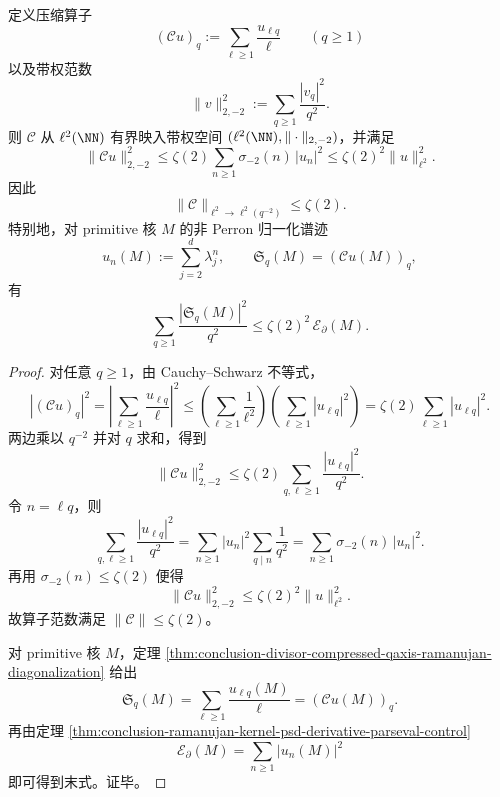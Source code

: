 \begin{theorem}\label{thm:conclusion-divisor-compressed-qaxis-hilbert-boundedness}
定义压缩算子
\[
(\mathcal C u)_q:=\sum_{\ell\ge 1}\frac{u_{\ell q}}{\ell}\qquad (q\ge 1)
\]
以及带权范数
\[
\|v\|_{2,-2}^2:=\sum_{q\ge 1}\frac{|v_q|^2}{q^2}.
\]
则 \(\mathcal C\) 从 \(\ell^2(\NN)\) 有界映入带权空间 \((\ell^2(\NN),\|\cdot\|_{2,-2})\)，并满足
\[
\|\mathcal C u\|_{2,-2}^2
\le
\zeta(2)\sum_{n\ge 1}\sigma_{-2}(n)\,|u_n|^2
\le
\zeta(2)^2\|u\|_{\ell^2}^2.
\]
因此
\[
\|\mathcal C\|_{\ell^2\to \ell^2(q^{-2})}\le \zeta(2).
\]
特别地，对 primitive 核 \(M\) 的非 Perron 归一化谱迹
\[
u_n(M):=\sum_{j=2}^d\lambda_j^n,
\qquad
\mathfrak S_q(M)=(\mathcal C u(M))_q,
\]
有
\[
\sum_{q\ge 1}\frac{|\mathfrak S_q(M)|^2}{q^2}
\le
\zeta(2)^2\,\mathcal E_{\partial}(M).
\]
\end{theorem}
\begin{proof}
对任意 \(q\ge 1\)，由 Cauchy--Schwarz 不等式，
\[
|(\mathcal C u)_q|^2
=
\left|\sum_{\ell\ge 1}\frac{u_{\ell q}}{\ell}\right|^2
\le
\left(\sum_{\ell\ge 1}\frac1{\ell^2}\right)
\left(\sum_{\ell\ge 1}|u_{\ell q}|^2\right)
=
\zeta(2)\sum_{\ell\ge 1}|u_{\ell q}|^2.
\]
两边乘以 \(q^{-2}\) 并对 \(q\) 求和，得到
\[
\|\mathcal C u\|_{2,-2}^2
\le
\zeta(2)\sum_{q,\ell\ge 1}\frac{|u_{\ell q}|^2}{q^2}.
\]
令 \(n=\ell q\)，则
\[
\sum_{q,\ell\ge 1}\frac{|u_{\ell q}|^2}{q^2}
=
\sum_{n\ge 1}|u_n|^2\sum_{q\mid n}\frac1{q^2}
=
\sum_{n\ge 1}\sigma_{-2}(n)\,|u_n|^2.
\]
再用 \(\sigma_{-2}(n)\le \zeta(2)\) 便得
\[
\|\mathcal C u\|_{2,-2}^2
\le
\zeta(2)^2\|u\|_{\ell^2}^2.
\]
故算子范数满足 \(\|\mathcal C\|\le \zeta(2)\)。

对 primitive 核 \(M\)，定理 \ref{thm:conclusion-divisor-compressed-qaxis-ramanujan-diagonalization} 给出
\[
\mathfrak S_q(M)=\sum_{\ell\ge 1}\frac{u_{\ell q}(M)}{\ell}=(\mathcal C u(M))_q.
\]
再由定理 \ref{thm:conclusion-ramanujan-kernel-psd-derivative-parseval-control}
\[
\mathcal E_{\partial}(M)=\sum_{n\ge 1}|u_n(M)|^2
\]
即可得到末式。证毕。
\end{proof}

